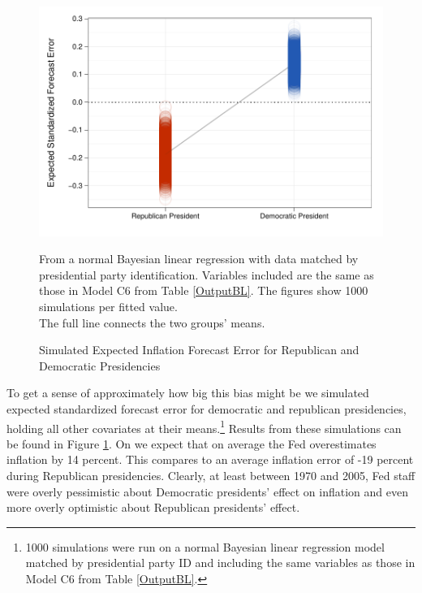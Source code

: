 \documentclass[a4paper]{article}\usepackage{graphicx, color}
\newenvironment{knitrout}{}{} %
\begin{document}
\begin{figure}[t]
    \caption{Simulated Expected Inflation Forecast Error for Republican and Democratic Presidencies}
    \label{ExpectValueParty}
    \begin{center}

\begin{knitrout}
\color{fgcolor}\includegraphics[width=0.7\linewidth]{figure/ExpectValueParty} 
\end{knitrout}

    \end{center}
    \begin{singlespace}
        {\scriptsize{From a normal Bayesian linear regression with data matched by presidential party identification. Variables included are the same as those in Model C6 from Table \ref{OutputBL}. The figures show 1000 simulations per fitted value. \\ The full line connects the two groups' means.}}
    \end{singlespace}
\end{figure}

To get a sense of approximately how big this bias might be we simulated expected standardized forecast error for democratic and republican presidencies, holding all other covariates at their means.\footnote{1000 simulations were run on a normal Bayesian linear regression model matched by presidential party ID and including the same variables as those in Model C6 from Table \ref{OutputBL}.} Results from these simulations can be found in Figure \ref{ExpectValueParty}. On we expect that on average the Fed overestimates inflation by 14 percent. This compares to an average inflation error of -19 percent during Republican presidencies. Clearly, at least between 1970 and 2005, Fed staff were overly pessimistic about Democratic presidents' effect on inflation and even more overly optimistic about Republican presidents' effect. 
\end{document}
